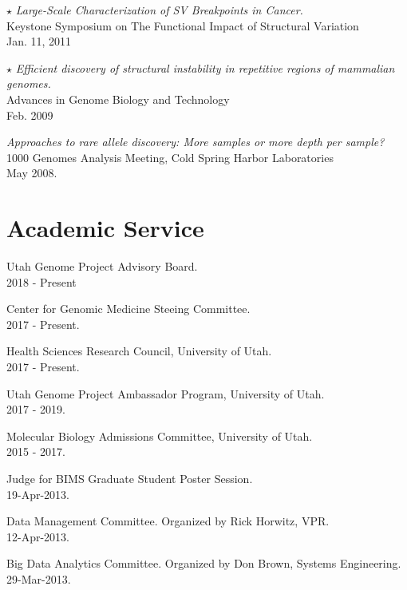 \documentclass[margin,line]{cv}
\begin{document}
\begin{resume}
    $\star$ \textit{Large-Scale Characterization of SV Breakpoints in Cancer.} \\
    Keystone Symposium on The Functional Impact of Structural Variation \\
    Jan. 11, 2011

    $\star$ \textit{Efficient discovery of structural instability in repetitive regions of mammalian genomes.} \\
    Advances in Genome Biology and Technology \\
    Feb. 2009

    \textit{Approaches to rare allele discovery: More samples or more depth per sample? } \\
    1000 Genomes Analysis Meeting, Cold Spring Harbor Laboratories \\
    May 2008.

    \section{\mysidestyle Academic Service}


    Utah Genome Project Advisory Board. \\
    2018 - Present

    Center for Genomic Medicine Steeing Committee. \\
    2017 - Present.

    Health Sciences Research Council, University of Utah. \\
    2017 - Present.

    Utah Genome Project Ambassador Program, University of Utah. \\
    2017 - 2019.

    Molecular Biology Admissions Committee, University of Utah. \\
    2015 - 2017.

    Judge for BIMS Graduate Student Poster Session. \\
    19-Apr-2013.

    Data Management Committee. Organized by Rick Horwitz, VPR.\\
    12-Apr-2013.

    Big Data Analytics Committee. Organized by Don Brown, Systems Engineering.\\
    29-Mar-2013.


\end{resume}
\end{document}
